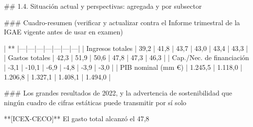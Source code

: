 \documentclass[10pt,a4paper]{article}
\begin{document}
## 1.4. Situación actual y perspectivas: agregada y por subsector

### Cuadro-resumen (verificar y actualizar contra el Informe trimestral de la IGAE vigente antes de usar en examen)

| **%
|---|---|---|---|---|---|---|
| Ingresos totales | 39,2 | 41,8 | 43,7 | 43,0 | 43,4 | 43,3 |
| Gastos totales | 42,3 | 51,9 | 50,6 | 47,8 | 47,3 | 46,3 |
| Cap./Nec. de financiación | -3,1 | -10,1 | -6,9 | -4,8 | -3,9 | -3,0 |
| PIB nominal (mm €) | 1.245,5 | 1.118,0 | 1.206,8 | 1.327,1 | 1.408,1 | 1.494,0 |

### Los grandes resultados de 2022, y la advertencia de sostenibilidad que ningún cuadro de cifras estáticas puede transmitir por sí solo

**[ICEX-CECO]** El gasto total alcanzó el 47,8%
\end{document}
